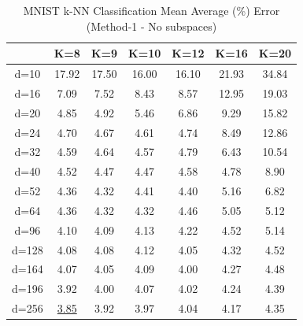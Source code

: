 \begin{table}[H]
\centering
\label{tab:table10}
\begin{tabular}{|c|c|c|c|c|c|c|}
\hline
& K=8 & K=9 & K=10 & K=12 & K=16 & K=20 \\
\hline
d=10 & 17.92 & 17.50 & 16.00 & 16.10 & 21.93 & 34.84 \\
d=16 & 7.09 & 7.52 & 8.43 & 8.57 & 12.95 & 19.03 \\
d=20 & 4.85 & 4.92 & 5.46 & 6.86 & 9.29 & 15.82 \\
d=24 & 4.70 & 4.67 & 4.61 & 4.74 & 8.49 & 12.86 \\
d=32 & 4.59 & 4.64 & 4.57 & 4.79 & 6.43 & 10.54 \\
d=40 & 4.52 & 4.47 & 4.47 & 4.58 & 4.78 & 8.90 \\
d=52 & 4.36 & 4.32 & 4.41 & 4.40 & 5.16 & 6.82 \\
d=64 & 4.36 & 4.32 & 4.32 & 4.46 & 5.05 & 5.12 \\
d=96 & 4.10 & 4.09 & 4.13 & 4.22 & 4.52 & 5.14 \\
d=128 & 4.08 & 4.08 & 4.12 & 4.05 & 4.32 & 4.52 \\
d=164 & 4.07 & 4.05 & 4.09 & 4.00 & 4.27 & 4.48 \\
d=196 & 3.92 & 4.00 & 4.07 & 4.02 & 4.24 & 4.39 \\
d=256 & \underline{3.85} & 3.92 & 3.97 & 4.04 & 4.17 & 4.35 \\
\hline
\end{tabular}
\caption{MNIST k-NN Classification Mean Average (\%) Error (Method-1 - No subspaces)}
\end{table}

